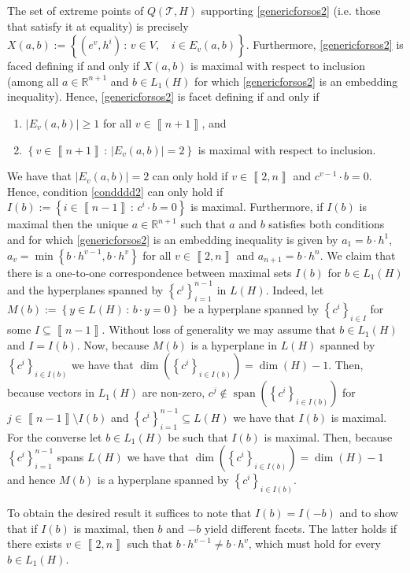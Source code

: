\documentclass[mnsc]{informs3}
\newcommand{\set}[1]{\left\{#1\right\}}                     %
\newcommand{\abs}[1]{\left|#1\right|}                       %
\newcommand{\bra}[1]{\left(#1\right)}
\newcommand{\sidx}[1]{\left\llbracket     #1 \right\rrbracket}
\newcommand{\Real}{\mathbb R}
\DeclareMathOperator{\spann}{span}
\begin{document}
The set of extreme points of $Q\bra{\mathcal{T},H}$ supporting \eqref{genericforsos2} (i.e. those that satisfy it at equality) is precisely $X\bra{a,b}:=\set{\bra{e^v,h^i}\,:\,  v\in V,\quad  i\in E_v\bra{a,b}}$.
Furthermore, \eqref{genericforsos2} is faced defining if and only if $X\bra{a,b}$ is maximal with respect to inclusion (among all $a\in \Real^{n+1}$ and $b\in L_1(H)$ for which \eqref{genericforsos2} is an embedding inequality). Hence, \eqref{genericforsos2} is facet defining if and only if
\begin{enumerate}
\item $\abs{E_v\bra{a,b}}\geq 1$ for all $v\in \sidx{n+1}$, and
\item\label{condddd2} $\set{v\in\sidx{n+1} \,:\, \abs{E_{v}\bra{a,b}}= 2}$ is maximal with respect to inclusion.
\end{enumerate}
We have that $\abs{E_{v}\bra{a,b}}= 2$ can only hold if $v\in\sidx{2,	n}$ and  $c^{v-1}\cdot b=0$. Hence, condition \ref{condddd2} can only hold if $I\bra{b}:=\set{i \in \sidx{n-1}\,:\,  c^i\cdot b=0}$ is maximal. Furthermore, if $I\bra{b}$ is maximal then the unique $a\in\Real^{n+1}$ such that $a$ and $b$ satisfies both conditions and for which \eqref{genericforsos2} is an embedding inequality is given by $a_1=b\cdot h^1$, $a_v=\min\set{ b\cdot h^{v-1} , b\cdot h^{v} }$ for all $v\in \sidx{2,n}$ and $a_{n+1}= b\cdot h^n$.
We claim that there is a one-to-one correspondence between maximal sets $I\bra{b}$ for $b\in L_1(H)$ and the hyperplanes spanned by $\set{c^i}_{i=1}^{n-1}$ in $L(H)$. Indeed, let $M(b):=\set{y\in L(H)\,:\,  b\cdot y=0}$ be a hyperplane spanned by  $\set{c^i}_{i\in I}$ for some $I\subseteq \sidx{n-1}$.  Without loss of generality we may assume that $b\in L_1(H)$ and $I=I(b)$. Now, because $M(b)$ is a hyperplane in $L(H)$ spanned by $\set{c^i}_{i\in I(b)}$ we have that $\dim\bra{\set{c^i}_{i\in I(b)}}=\dim\bra{H}-1$.
Then, because vectors in $L_1\bra{H}$ are non-zero, $c^j\notin \spann\bra{\set{c^i}_{i\in I(b)}}$  for $j\in \sidx{n-1}\setminus I(b)$ and $\set{c^i}_{i=1}^{n-1}\subseteq L(H)$ we have that $I(b)$ is maximal. For the converse let $b\in L_1(H)$ be such that $I(b)$ is maximal. 
Then, because $\set{c^i}_{i=1}^{n-1}$ spans $L(H)$ we have that $\dim\bra{\set{c^i}_{i\in I(b)}}=\dim(H)-1$ and hence $M(b)$ is a hyperplane spanned by $\set{c^i}_{i\in I(b)}$.

To obtain the desired result it suffices to note that $I(b)=I(-b)$ and to show that if $I(b)$ is maximal, then $b$ and $-b$ yield different facets. The latter holds if there exists $v\in \sidx{2,n}$ such that $ b\cdot h^{v-1} \neq  b\cdot h^{v}$, which must hold for every $b\in L_1(H)$.
\Halmos\endproof
\end{document}

